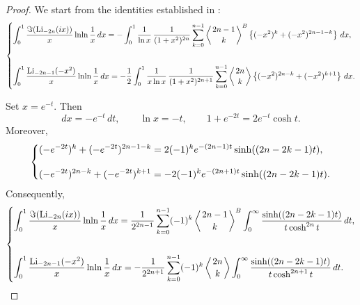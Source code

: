 \documentclass[11pt,twoside]{article}
\numberwithin{equation}{section}
\begin{document}
\begin{proof}
We start from the identities established in
\cite{TallaWaffo2026arxiv2602.16761}:
\begin{equation}\label{eq:polylogarithmic-Eulerian-reduction}
\begin{dcases}
\displaystyle
\int_{0}^{1}
\frac{\Im\!\left(\operatorname{Li}_{-2n}(ix)\right)}{x}
\ln\!\ln\frac{1}{x}\,dx
=
-\int_{0}^{1}
\frac{1}{\ln x}\,
\frac{1}{(1+x^{2})^{2n}}
\sum_{k=0}^{n-1}
\left\langle {2n-1\atop k}\right\rangle^{B}
\left\{
(-x^{2})^{k}
+
(-x^{2})^{2n-1-k}
\right\}\,dx,
\\[4ex]
\displaystyle
\int_{0}^{1}
\frac{\operatorname{Li}_{-2n-1}(-x^{2})}{x}
\ln\!\ln\frac{1}{x}\,dx
=
-\frac{1}{2}
\int_{0}^{1}
\frac{1}{x\ln x}\,
\frac{1}{(1+x^{2})^{2n+1}}
\sum_{k=0}^{n-1}
\left\langle {2n\atop k}\right\rangle
\left\{
(-x^{2})^{2n-k}
+
(-x^{2})^{k+1}
\right\}\,dx.
\end{dcases}
\end{equation}

Set \(\displaystyle x=e^{-t}.\) Then
\[
dx=-e^{-t}\,dt,
\qquad
\ln x=-t,
\qquad
1+e^{-2t}=2e^{-t}\cosh t.
\]
Moreover,
\begin{equation}\label{eq:exponential-to-hyperbolic}
\begin{dcases}
\displaystyle
(-e^{-2t})^{k}
+
(-e^{-2t})^{2n-1-k}
=
2(-1)^k e^{-(2n-1)t}
\sinh((2n-2k-1)t),
\\[2ex]
\displaystyle
(-e^{-2t})^{2n-k}
+
(-e^{-2t})^{k+1}
=
-2(-1)^k e^{-(2n+1)t}
\sinh((2n-2k-1)t).
\end{dcases}
\end{equation}
Consequently,
\begin{equation}\label{eq:polylogarithmic-hyperbolic-reduction}
\begin{dcases}
\displaystyle
\int_{0}^{1}
\frac{\Im\!\left(\operatorname{Li}_{-2n}(ix)\right)}{x}
\ln\!\ln\frac{1}{x}\,dx
=
\frac{1}{2^{2n-1}}
\sum_{k=0}^{n-1}
(-1)^k
\left\langle {2n-1\atop k}\right\rangle^{B}
\int_{0}^{\infty}
\frac{\sinh((2n-2k-1)t)}
{t\cosh^{2n}t}\,dt,
\\[4ex]
\displaystyle
\int_{0}^{1}
\frac{\operatorname{Li}_{-2n-1}(-x^{2})}{x}
\ln\!\ln\frac{1}{x}\,dx
=
-\frac{1}{2^{2n+1}}
\sum_{k=0}^{n-1}
(-1)^k
\left\langle {2n\atop k}\right\rangle
\int_{0}^{\infty}
\frac{\sinh((2n-2k-1)t)}
{t\cosh^{2n+1}t}\,dt.
\end{dcases}
\end{equation}


\end{proof}
\end{document}
